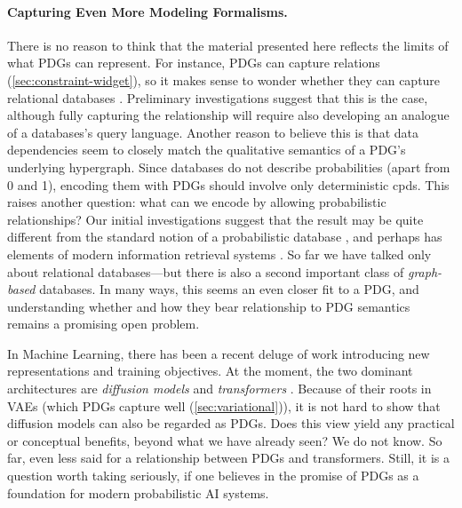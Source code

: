 \paragraph{Capturing Even More Modeling Formalisms.}
There is no reason to think that the material presented here reflects the limits of what PDGs can represent. 
%
For instance, PDGs can capture relations (\cref{sec:constraint-widget}), so it makes sense to wonder whether they can capture relational databases
    \citep{abiteboul1995foundations}. 
Preliminary investigations suggest that this is the case,
    although fully capturing the relationship will require also developing an analogue of a databases's query language.  
Another reason to believe this is that data dependencies \citep{fagin1986theory} seem to closely match the qualitative semantics of a PDG's underlying hypergraph. 
Since databases do not describe probabilities (apart from 0 and 1), 
    encoding them with PDGs should involve only deterministic cpds.
This raises another question: what can we encode by allowing probabilistic relationships?
Our initial investigations suggest that the result may be quite different from the standard notion of a probabilistic database \citep{suciu2011probabilistic}, and perhaps has elements of modern information retrieval systems \citep{mitra-neural-info-retrieval,karpukhin2020dense}.
%
So far we have talked only about relational databases---but there is also a second important class of \emph{graph-based} databases.
In many ways, this seems an even closer fit to a PDG, and understanding whether and how they bear relationship to PDG semantics remains a promising open problem. 

In Machine Learning, there has been a recent deluge of work introducing new representations and training objectives. At the moment, the two dominant architectures are \emph{diffusion models} \citep{pmlr-v37-sohl-dickstein15,ho2020denoising} and \emph{transformers} \citep{vaswani-attn}. 
Because of their roots in VAEs (which PDGs capture well (\cref{sec:variational})), it is not hard to show that diffusion models can also be regarded as PDGs. %
    Does this view yield any practical or conceptual benefits, beyond what we have already seen? 
    We do not know.
%
So far, even less said for a relationship between PDGs and transformers.
Still, it is a question worth taking seriously, if one believes in the promise of PDGs as a foundation for modern probabilistic AI systems.      

